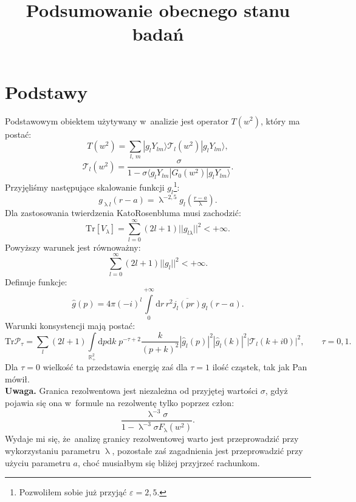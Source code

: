 \documentclass[a4paper,11pt]{article}
\title{Podsumowanie obecnego stanu badań}
\author{}
\newcommand{\de}{\mathrm{d}}
\newcommand{\T}{\mathcal{T}_{ l }}
\newcommand{\gYl}{ \langle g_{ l } Y_{ l m } | }
\newcommand{\gYr}{ | g_{ l } Y_{ l m } \rangle }
\newcommand{\gH}{\widehat{ g }}
\begin{document}
\maketitle

\section*{Podstawy}

Podstawowym obiektem użytywany w~analizie jest operator $T( w^{ 2 } )$, który ma postać:
\begin{equation}
T( w^{ 2 } ) = \sum_{ l,\, m } \gYr \T( w^{ 2 } ) \gYr, \label{eq:1}
\end{equation}
\begin{equation}
\T( w^{ 2 } ) = \frac{ \sigma }{ 1 - \sigma \gYl G_{ 0 }( w^{ 2 } ) \gYr } \label{eq:2}.
\end{equation}
Przyjęliśmy następujące skalowanie funkcji $g_{ l }$\footnote{Pozwoliłem sobie już przyjąć $\varepsilon = 2,5$.}:
\begin{equation}
g_{ \uplambda l }( r - a ) = \uplambda^{ -2,5 } g_{ l }\left( \tfrac{ r - a }{ \uplambda } \right). \label{eq:3}
\end{equation}
Dla zastosowania twierdzenia Kato\dywiz Rosenbluma musi zachodzić:
\begin{equation}
\mathrm{Tr}[ V_{ \lambda } ] = \sum_{ l = 0 }^{ \infty } ( 2 l + 1 ) || g_{ l \lambda } ||^{ 2 } < +\infty. \label{eq:4}
\end{equation}
Powyższy warunek jest równoważny:
\begin{equation}
\sum_{ l = 0 }^{ \infty } ( 2 l + 1 ) || g_{ l } ||^{ 2 } < +\infty. \label{eq:5}
\end{equation}
Definuje funkcje:
\begin{equation}
\gH( p ) = 4 \pi ( -i )^{ l } \int\limits_{ 0 }^{ +\infty } \de r \, r^{ 2 } \overline{ j_{ l }( p r ) } g_{ l }( r - a ). \label{eq:6}
\end{equation}
Warunki konsystencji mają postać:
\begin{equation}
\mathrm{Tr} \mathcal{P}_{ \tau } = \sum_{ l } ( 2 l + 1 ) \int\limits_{ \mathbb{R}_{ + }^{ 2 } } \de p \de k \; p^{ -\tau + 2 } \frac{ k }{ ( p + k )^{ 2 } } | \widehat{ g }_{ l }( p ) |^{ 2 } | \widehat{ g }_{ l }( k ) |^{ 2 } | \T( k + i 0 ) |^{ 2 }, \qquad \tau = 0, 1. \label{eq:7}
\end{equation}
Dla $\tau = 0$ wielkość ta przedstawia energię zaś dla $\tau = 1$ ilość cząstek, tak jak Pan mówił.\\
\textbf{Uwaga.} Granica rezolwentowa jest niezależna od przyjętej wartości $\sigma$, gdyż pojawia się ona w~formule na rezolwentę tylko poprzez człon:
\begin{displaymath}
\frac{ \uplambda^{ -3 } \sigma }{ 1 - \uplambda^{ -3 } \sigma F_{ \uplambda }( w^{ 2 } ) }.
\end{displaymath}
Wydaje mi się, że~analizę granicy rezolwentowej warto jest przeprowadzić przy wykorzystaniu parametru $\uplambda$, pozostałe zaś zagadnienia jest przeprowadzić przy użyciu parametru $a$, choć musiałbym się bliżej przyjrzeć rachunkom.
\end{document}
